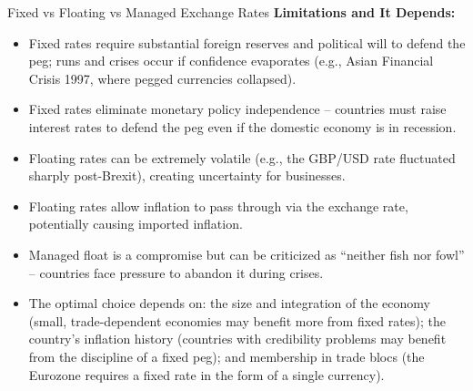 \documentclass[11pt, a4paper, twoside]{book}
\begin{document}
\begin{evaluation}{Fixed vs Floating vs Managed Exchange Rates}
\textbf{Limitations and It Depends:}
\begin{itemize}
  \item Fixed rates require substantial foreign reserves and political will to defend the peg; runs and crises occur if confidence evaporates (e.g., Asian Financial Crisis 1997, where pegged currencies collapsed).
  \item Fixed rates eliminate monetary policy independence -- countries must raise interest rates to defend the peg even if the domestic economy is in recession.
  \item Floating rates can be extremely volatile (e.g., the GBP/USD rate fluctuated sharply post-Brexit), creating uncertainty for businesses.
  \item Floating rates allow inflation to pass through via the exchange rate, potentially causing imported inflation.
  \item Managed float is a compromise but can be criticized as ``neither fish nor fowl'' -- countries face pressure to abandon it during crises.
  \item The optimal choice depends on: the size and integration of the economy (small, trade-dependent economies may benefit more from fixed rates); the country's inflation history (countries with credibility problems may benefit from the discipline of a fixed peg); and membership in trade blocs (the Eurozone requires a fixed rate in the form of a single currency).
\end{itemize}
\end{evaluation}
\end{document}
